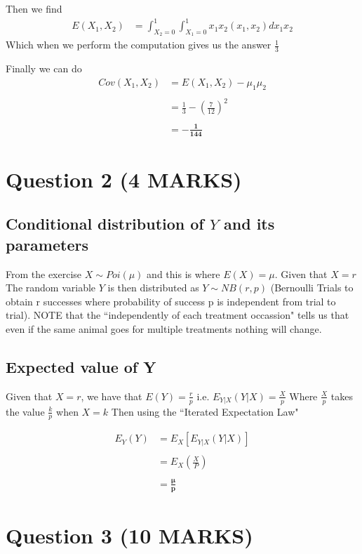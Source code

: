 \documentclass[11pt]{article}
\begin{document}
Then we find
\begin{align*}
  E(X_{1},X_{2}) &= \int_{X_{2}=0}^{1}\int_{X_{1}=0}^{1} x_{1}x_{2}(x_{1},x_{2})dx_{1}x_{2}
\end{align*}
Which when we perform the computation gives us the answer $\frac{1}{3}$

Finally we can do
\begin{align*}
  Cov(X_{1},X_{2}) &= E(X_{1},X_{2}) -\mu_{1}\mu_{2} \\ \\
                   &= \frac{1}{3} -\left(\frac{7}{12}\right)^{2} \\ \\
                   &= \boxed {\bm{-\frac{1}{144}}}
\end{align*}
\section{Question 2 (4 MARKS)}
\subsection{Conditional distribution of $Y$ and its parameters}
From the exercise $X \sim Poi(\mu)$ and this is where $E(X)=\mu$. Given that $X=r$ The random variable $Y$ is then distributed as $Y \sim NB(r,p)$ (Bernoulli Trials to obtain r successes where probability of success p is independent from trial to trial). NOTE that the ``independently of each treatment occassion" tells us that even if the same animal goes for multiple treatments nothing will change.

\subsection{Expected value of Y}
Given that $X=r$, we have that $E(Y)= \frac{r}{p}$ i.e. $E_{Y|X}(Y|X) = \frac{X}{p}$ Where $\frac{X}{p}$ takes the value $\frac{k}{p}$ when $X=k$ Then using the ``Iterated Expectation Law"

\begin{align*}
  E_{Y}(Y) &= E_{X}[E_{Y|X}(Y|X)] \\ \\
           &= E_{X} \left(\frac{X}{P}\right) \\ \\
           &= \boxed{\bm{\frac{\mu}{p}}}
\end{align*}
\section{Question 3 (10 MARKS)}
\end{document}

